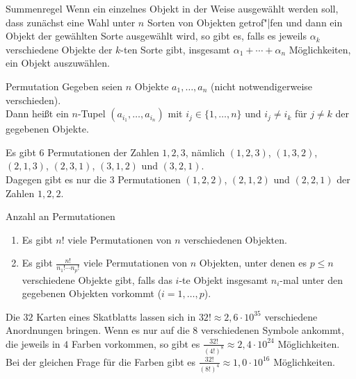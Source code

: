 \begin{Satz}{Summenregel}
    Wenn ein einzelnes Objekt in der Weise ausgewählt werden soll, dass zunächst eine Wahl unter
    $n$ Sorten von Objekten getrof"|fen und dann ein Objekt der gewählten Sorte ausgewählt wird,
    so gibt es, falls es jeweils $\alpha_k$ verschiedene Objekte der $k$-ten Sorte gibt,
    insgesamt $\alpha_1 + \dotsb + \alpha_n$ Möglichkeiten, ein Objekt auszuwählen.
\end{Satz}

\linie

\begin{Def}{Permutation}
    Gegeben seien $n$ Objekte $a_1, \dotsc, a_n$ (nicht notwendigerweise verschieden).\\
    Dann heißt ein $n$-Tupel $(a_{i_1}, \dotsc, a_{i_n})$ mit $i_j \in \{1, \dotsc, n\}$ und
    $i_j \not= i_k$ für $j \not= k$  der gegebenen Objekte.
\end{Def}

\begin{Bsp}
    Es gibt $6$ Permutationen der Zahlen $1, 2, 3$, nämlich
    $(1, 2, 3)$, $(1, 3, 2)$, $(2, 1, 3)$, $(2, 3, 1)$, $(3, 1, 2)$ und $(3, 2, 1)$.\\
    Dagegen gibt es nur die $3$ Permutationen $(1, 2, 2)$, $(2, 1, 2)$ und $(2, 2, 1)$
    der Zahlen $1, 2, 2$.
\end{Bsp}

\begin{Satz}{Anzahl an Permutationen}
    \begin{enumerate}
        \item
        Es gibt $n!$ viele Permutationen von $n$ verschiedenen Objekten.

        \item
        Es gibt $\frac{n!}{n_1! \dotsm n_p!}$ viele Permutationen von $n$ Objekten,
        unter denen es $p \le n$ verschiedene Objekte gibt,
        falls das $i$-te Objekt insgesamt $n_i$-mal unter den gegebenen Objekten vorkommt
        ($i = 1, \dotsc, p$).
    \end{enumerate}
\end{Satz}

\begin{Bsp}
    Die $32$ Karten eines Skatblatts lassen sich in $32! \approx 2{,}6 \cdot 10^{35}$
    verschiedene Anordnungen bringen.
    Wenn es nur auf die $8$ verschiedenen Symbole ankommt, die jeweils in $4$ Farben vorkommen,
    so gibt es $\frac{32!}{(4!)^8} \approx 2{,}4 \cdot 10^{24}$ Möglichkeiten.
    Bei der gleichen Frage für die Farben gibt es $\frac{32!}{(8!)^4} \approx 1{,}0 \cdot 10^{16}$
    Möglichkeiten.
\end{Bsp}

